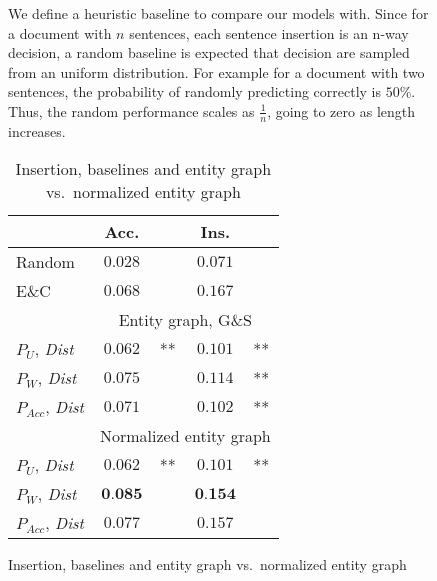 \begin{figure}[!t]
We define a heuristic baseline to compare our models with. 
Since for a document with $n$ sentences, each sentence insertion is an n-way decision, a random baseline is expected that decision are sampled from an uniform distribution. 
For example for a document with two sentences, the probability of randomly predicting correctly is $50\%$. 
Thus, the random performance scales as $\frac{1}{n}$, going to zero as length increases.

\begin{table}[!b]
\centering
\begin{small}
\begin{tabular}{l|c@{}lc@{}l} 

		& Acc. & 	& Ins.  & \\\hline
 Random & $0.028$ & 	& $0.071$ & \\
 E\&C	& $0.068$ & 	& $0.167$ & \\\hline

		& \multicolumn{4}{|c}{Entity graph, G\&S} \\\hline 
 $P_U$, \textit{Dist} & $0.062$&** & $0.101$ & **\\
 $P_W$, \textit{Dist} & $0.075$& 	   & $0.114$ & **\\
 $P_{Acc}$, \textit{Dist} & $0.071$& 	 & $0.102$ & ** \\\hline
  & \multicolumn{4}{|c}{Normalized entity graph} \\\hline 
 $P_U$, \textit{Dist} & $0.062$&** & $0.101$ & **  \\
 $P_W$, \textit{Dist} & $\textbf{0.085}$& 	 & $\textbf{0.154}$&\\
 $P_{Acc}$, \textit{Dist} & $0.077$& 	 & $0.157$ & \\
\end{tabular}
\end{small}
\caption{Insertion, baselines and entity graph vs.\ normalized entity
  graph}\label{table:insertion_results} 
\end{table}


\end{figure}
